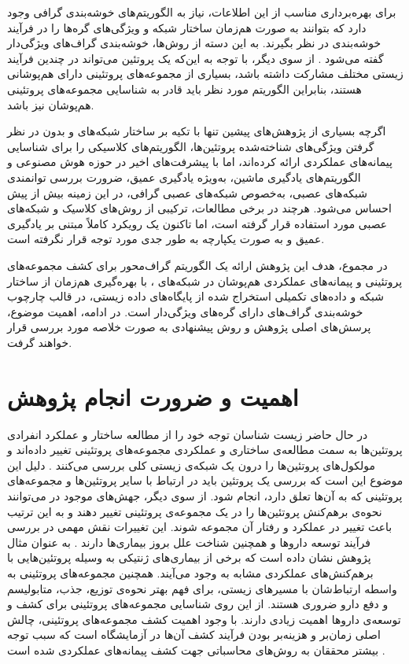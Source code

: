 برای بهره‌برداری مناسب از این اطلاعات، نیاز به الگوریتم‌های خوشه‌بندی گرافی وجود دارد که بتوانند به صورت هم‌زمان ساختار شبکه و ویژگی‌های گره‌ها را در فرآیند خوشه‌بندی در نظر بگیرند. به این دسته از روش‌ها، خوشه‌بندی گراف‌های ویژگی‌دار گفته می‌شود \cite{clustering}. از سوی دیگر، با توجه به این‌که یک پروتئین می‌تواند در چندین فرآیند زیستی مختلف مشارکت داشته باشد، بسیاری از مجموعه‌های پروتئینی دارای هم‌پوشانی هستند، بنابراین الگوریتم مورد نظر باید قادر به شناسایی مجموعه‌های پروتئینی هم‌پوشان نیز باشد.

اگرچه بسیاری از پژوهش‌های پیشین تنها با تکیه بر ساختار شبکه‌های  و بدون در نظر گرفتن ویژگی‌های شناخته‌شده پروتئین‌ها، الگوریتم‌های کلاسیکی را برای شناسایی پیمانه‌های عملکردی ارائه کرده‌اند، اما با پیشرفت‌های اخیر در حوزه هوش مصنوعی و الگوریتم‌های یادگیری ماشین، به‌ویژه یادگیری عمیق، ضرورت بررسی توانمندی شبکه‌های عصبی، به‌خصوص شبکه‌های عصبی گرافی، در این زمینه بیش از پیش احساس می‌شود. هرچند در برخی مطالعات، ترکیبی از روش‌های کلاسیک و شبکه‌های عصبی مورد استفاده قرار گرفته است، اما تاکنون یک رویکرد کاملاً مبتنی بر یادگیری عمیق و به صورت یکپارچه به طور جدی مورد توجه قرار نگرفته است.

در مجموع، هدف این پژوهش ارائه یک الگوریتم گراف‌محور برای کشف مجموعه‌های پروتئینی و پیمانه‌های عملکردی هم‌پوشان در شبکه‌های ، با بهره‌گیری هم‌زمان از ساختار شبکه و داده‌های تکمیلی استخراج‌ شده از پایگاه‌های داده زیستی، در قالب چارچوب خوشه‌بندی گراف‌های دارای گره‌های ویژگی‌دار است. در ادامه، اهمیت موضوع، پرسش‌های اصلی پژوهش و روش پیشنهادی به صورت خلاصه مورد بررسی قرار خواهند گرفت.

\section{اهمیت و ضرورت انجام پژوهش}

در حال حاضر زیست شناسان توجه خود را از مطالعه ساختار و عملکرد انفرادی پروتئین‌ها به سمت مطالعه‌ی ساختاری و عملکردی ‌‌مجموعه‌های پروتئینی تغییر داده‌اند و مولکول‌های پروتئین‌ها را درون یک شبکه‌ی زیستی کلی بررسی می‌کنند \cite{farutin2006edge}.
دلیل این موضوع این است که بررسی یک پروتئین باید در ارتباط با سایر پروتئین‌ها و مجموعه‌های پروتئینی‌ که به آن‌ها تعلق دارد، انجام شود.
از سوی دیگر، جهش‌های موجود در  می‌توانند نحوه‌ی برهم‌کنش پروتئین‌ها را در یک مجموعه‌ی پروتئینی تغییر دهند و به این ترتیب باعث تغییر در عملکرد و رفتار آن مجموعه شوند. این تغییرات نقش مهمی در بررسی فرآیند توسعه داروها و همچنین شناخت علل بروز بیماری‌ها دارند \cite{zaki2018improving}.
به عنوان مثال پژوهش‌ \cite{macropol2009rrw} نشان داده‌ است که برخی از بیماری‌های ژنتیکی به وسیله پروتئین‌هایی با برهم‌کنش‌های عملکردی مشابه به وجود می‌آیند. همچنین مجموعه‌های پروتئینی به واسطه ارتباط‌‌شان با مسیر‌های زیستی، برای فهم بهتر نحوه‌ی توزیع، جذب، متابولیسم و دفع دارو ضروری هستند. از این روی شناسایی مجموعه‌های پروتئینی برای کشف و توسعه‌ی دارو‌ها اهمیت زیادی دارند.
با وجود اهمیت کشف مجموعه‌های پروتئینی، چالش اصلی زمان‌بر و هزینه‌بر بودن فرآیند کشف آن‌ها در آزمایشگاه است که سبب توجه بیشتر محققان به روش‌های محاسباتی جهت کشف پیمانه‌های عملکردی شده است \cite{adappi}.

